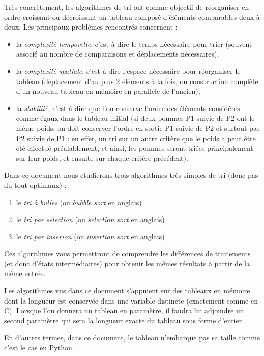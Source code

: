 \documentclass[11pt,a4paper]{article}
\begin{document}
Très concrètement, les algorithmes de tri ont comme objectif de réorganiser en ordre croissant ou décroissant un tableau composé d'éléments comparables deux à deux.
Les principaux problèmes rencontrés concernent :
\begin{itemize}
\item la \textit{complexité temporelle}, c'est-à-dire le temps nécessaire pour trier (souvent associé au nombre de comparaisons et déplacements nécessaires),
\item la \textit{complexité spatiale}, c'est-à-dire l'espace nécessaire pour réorganiser le tableau (déplacement d'au plus 2 éléments à la fois, ou construction complète d'un nouveau tableau en mémoire en parallèle de l'ancien),
\item la \textit{stabilité}, c'est-à-dire que l'on conserve l'ordre des éléments considérés comme égaux dans le tableau initial (si deux pommes P1 suivie de P2 ont le même poids, on doit conserver l'ordre en sortie P1 suivie de P2 et surtout pas P2 suivie de P1 : en effet, un tri sur un autre critère que le poids a peut être été effectué préalablement, et ainsi, les pommes seront triées principalement sur leur poids, et ensuite sur chaque critère précédent).
\end{itemize}

\bigskip

Dans ce document nous étudierons trois algorithmes très simples de tri (donc pas du tout optimaux) :
\begin{enumerate}
\item le \textit{tri à bulles} (ou \textit{bubble sort} en anglais)
\item le \textit{tri par sélection} (ou \textit{selection sort} en anglais)
\item le \textit{tri par inserion} (ou \textit{insertion sort} en anglais)
\end{enumerate}
Ces algorithmes vous permettront de comprendre les différences de traitements (et donc d'états intermédiaires) pour obtenir les mêmes résultats à partir de la même entrée.

\bigskip

Les algorithmes vus dans ce document s'appuient sur des tableaux en mémoire dont la longueur est conservée dans une variable distincte (exactement comme en C).
Lorsque l'on donnera un tableau en paramètre, il faudra lui adjoindre un second paramètre qui sera la longueur exacte du tableau sous forme d'entier.

En d'autres termes, dans ce document, le tableau n'embarque pas sa taille comme c'est le cas en Python.
\end{document}
